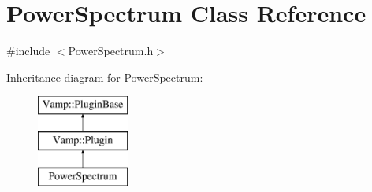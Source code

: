 \hypertarget{class_power_spectrum}{}\section{Power\+Spectrum Class Reference}
\label{class_power_spectrum}


{\ttfamily \#include $<$Power\+Spectrum.\+h$>$}

Inheritance diagram for Power\+Spectrum\+:\begin{figure}[H]
\begin{center}
\leavevmode
\includegraphics[height=3.000000cm]{class_power_spectrum}
\end{center}
\end{figure}
